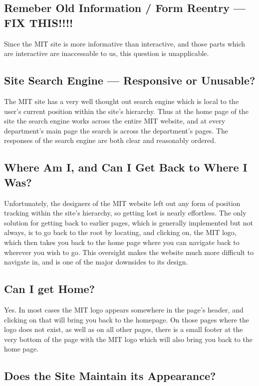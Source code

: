 \subsection*{Remeber Old Information / Form Reentry --- FIX THIS!!!!}

Since the MIT site is more informative than interactive, and those parts which are interactive
are inaccessable to us, this question is unapplicable.

\subsection*{Site Search Engine --- Responsive or Unusable?}

The MIT site has a very well thought out search engine which is local to the user's current
position within the site's hierarchy. Thus at the home page of the site the search engine
works across the entire MIT website, and at every department's main page the search is
across the department's pages. The responses of the search engine are both clear and
reasonably ordered.

\subsection*{Where Am I, and Can I Get Back to Where I Was?}

Unfortunately, the designers of the MIT website left out any form of position tracking within
the site's hierarchy, so getting lost is nearly effortless. The only solution for getting back
to earlier pages, which is generally implemented but not always, is to go back to the root by
locating, and clicking on, the MIT logo, which then takes you back to the home page where you
can navigate back to wherever you wish to go. This oversight makes the website much more
difficult to navigate in, and is one of the major downsides to its design.

\subsection*{Can I get Home?}

Yes. In most cases the MIT logo appears somewhere in the page's header, and clicking on that
will bring you back to the homepage. On those pages where the logo does not exist, as well as
on all other pages, there is a small footer at the very bottom of the page with the MIT logo
which will also bring you back to the home page.

\subsection*{Does the Site Maintain its Appearance?}

